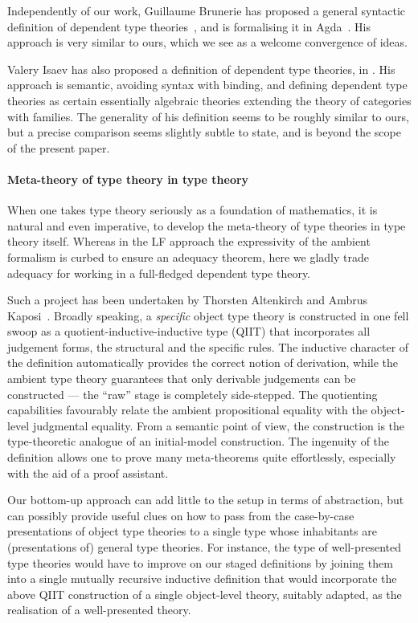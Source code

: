 Independently of our work, Guillaume Brunerie has proposed a general syntactic definition of dependent type theories~\citep{brunerie20}, and is formalising it in Agda~\citep{brunerie:_agda}.
%
His approach is very similar to ours, which we see as a welcome convergence of ideas.

Valery Isaev has also proposed a definition of dependent type theories, in \citep{isaev17:_algeb}.
%
His approach is semantic, avoiding syntax with binding, and defining dependent type theories as certain essentially algebraic theories extending the theory of categories with families.
%
The generality of his definition seems to be roughly similar to ours, but a precise comparison seems slightly subtle to state, and is beyond the scope of the present paper.


\paragraph*{Meta-theory of type theory in type theory}

When one takes type theory seriously as a foundation of mathematics, it is natural and even imperative, to develop the meta-theory of type theories in type theory itself. Whereas in the LF approach the expressivity of the ambient formalism is curbed to ensure an adequacy theorem, here we gladly trade adequacy for working in a full-fledged dependent type theory.

Such a project has been undertaken by Thorsten Altenkirch and Ambrus Kaposi~\citep{qiit-tt}. Broadly speaking, a \emph{specific} object type theory is constructed in one fell swoop as a quotient-inductive-inductive type (QIIT) that incorporates all judgement forms, the structural and the specific rules. The inductive character of the definition automatically provides the correct notion of derivation, while the ambient type theory guarantees that only derivable judgements can be constructed --- the ``raw'' stage is completely side-stepped. The quotienting capabilities favourably relate the ambient propositional equality with the object-level judgmental equality. From a semantic point of view, the construction is the type-theoretic analogue of an initial-model construction. The ingenuity of the definition allows one to prove many meta-theorems quite effortlessly, especially with the aid of a proof assistant.

Our bottom-up approach can add little to the setup in terms of abstraction, but can possibly provide useful clues on how to pass from the case-by-case presentations of object type theories to a single type whose inhabitants are (presentations of) general type theories. For instance, the type of well-presented type theories would have to improve on our staged definitions by joining them into a single mutually recursive inductive definition that would incorporate the above QIIT construction of a single object-level theory, suitably adapted, as the realisation of a well-presented theory.

